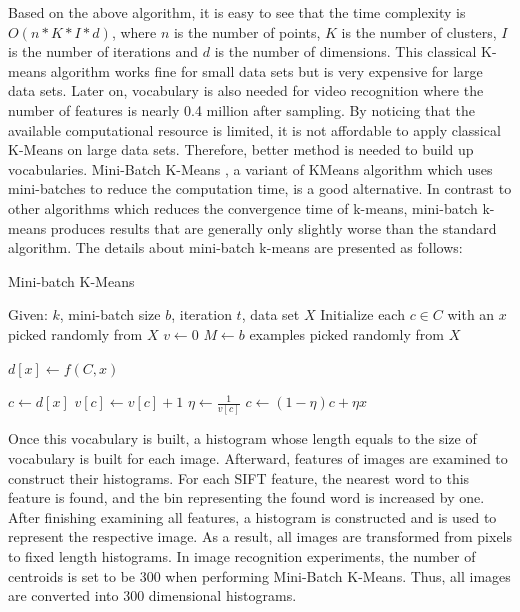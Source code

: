 \noindent Based on the above algorithm, it is easy to see that the time complexity is $O(n*K*I*d)$, where $n$ is the number of points, $K$ is the number of clusters, $I$ is the number of iterations and $d$ is the number of dimensions. This classical K-means algorithm works fine for small data sets but is very expensive for large data sets. Later on, vocabulary is also needed for video recognition where the number of features is nearly 0.4 million after sampling. By noticing that the available computational resource is limited, it is not affordable to apply classical K-Means on large data sets. Therefore, better method is needed to build up vocabularies.  Mini-Batch K-Means \cite{sculley2010web}, a variant of KMeans algorithm which uses mini-batches to reduce the computation time, is a good alternative. In contrast to other algorithms which reduces the convergence time of k-means, mini-batch k-means produces results that are generally only slightly worse than the standard algorithm. The details about mini-batch k-means are presented as follows:

\begin{algorithm}
  \caption{Mini-batch K-Means}
  \begin{algorithmic}[1]
  \State Given: $k$, mini-batch size $b$, iteration $t$, data set $X$
  \State Initialize each $c \in C$ with an $x$ picked randomly from $X$
  \State $v \gets 0$
  \State $M \gets b$ examples picked randomly from $X$
  
  \State $d[x] \gets f(C, x)$ 
  \EndFor

  \State $c \gets d[x]$ 
  \State $v[c] \gets v[c] + 1$ 
  \State $\eta \gets \frac{1}{v[c]}$ 
  \State $c \gets (1 - \eta)c + \eta x$ 
  \EndFor
  
  \EndFor
  \end{algorithmic}
\end{algorithm}

\noindent Once this vocabulary is built, a histogram whose length equals to the size of vocabulary is built for each image. Afterward, features of images are examined to construct their histograms. For each SIFT feature, the nearest word to this feature is found, and the bin representing the found word is increased by one. After finishing examining all features, a histogram is constructed and is used to represent the respective image. As a result, all images are transformed from pixels to fixed length histograms. In image recognition experiments, the number of centroids is set to be 300 when performing Mini-Batch K-Means. Thus, all images are converted into 300 dimensional histograms. 

